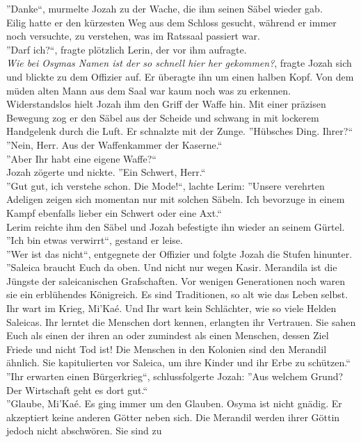 ''Danke``, murmelte Jozah zu der Wache, die ihm seinen Säbel wieder gab.\\
Eilig hatte er den kürzesten Weg aus dem Schloss gesucht, während er immer noch versuchte, zu 
verstehen, was im Ratssaal passiert war.\\
''Darf ich?``, fragte plötzlich Lerin, der vor ihm aufragte.\\
\textit{Wie bei Osymas Namen ist der so schnell hier her gekommen?}, fragte Jozah sich und blickte 
zu dem Offizier auf. Er überagte ihn um einen halben Kopf. Von dem müden alten Mann aus dem Saal 
war kaum noch was zu erkennen. Widerstandslos hielt Jozah ihm den Griff der Waffe hin. Mit einer 
präzisen Bewegung zog er den Säbel aus der Scheide und schwang in mit lockerem Handgelenk 
durch die Luft. Er schnalzte mit der Zunge. ''Hübsches Ding. Ihrer?``\\
''Nein, Herr. Aus der Waffenkammer der Kaserne.``\\
''Aber Ihr habt eine eigene Waffe?``\\
Jozah zögerte und nickte. ''Ein Schwert, Herr.``\\
''Gut gut, ich verstehe schon. Die Mode!``, lachte Lerim: ''Unsere verehrten Adeligen zeigen sich 
momentan nur mit solchen Säbeln. Ich bevorzuge in einem Kampf ebenfalls lieber ein Schwert oder 
eine Axt.``\\
Lerim reichte ihm den Säbel und Jozah befestigte ihn wieder an seinem Gürtel. ''Ich bin etwas 
verwirrt``, gestand er leise.\\
''Wer ist das nicht``, entgegnete der Offizier und folgte Jozah die Stufen hinunter. ''Saleica 
braucht Euch da oben. Und nicht nur wegen Kasir. Merandila ist die Jüngste der saleicanischen 
Grafschaften. Vor wenigen Generationen noch waren sie ein erblühendes Königreich. Es sind 
Traditionen, so alt wie das Leben selbst. Ihr wart im Krieg, Mi'Kaé. Und Ihr wart kein 
Schlächter, wie so viele Helden Saleicas. Ihr lerntet die Menschen dort kennen, erlangten ihr 
Vertrauen. Sie sahen Euch als einen der ihren an oder zumindest als einen Menschen, dessen Ziel 
Friede und nicht Tod ist! Die Menschen in den Kolonien sind den Merandil ähnlich. Sie kapitulierten 
vor Saleica, um ihre Kinder und ihr Erbe zu schützen.``\\
''Ihr erwarten einen Bürgerkrieg``, schlussfolgerte Jozah: ''Aus welchem Grund? Der Wirtschaft geht 
es dort gut.``\\
''Glaube, Mi'Kaé. Es ging immer um den Glauben. Osyma ist nicht gnädig. Er akzeptiert keine anderen 
Götter neben sich. Die Merandil werden ihrer Göttin jedoch nicht abschwören. Sie sind zu 
